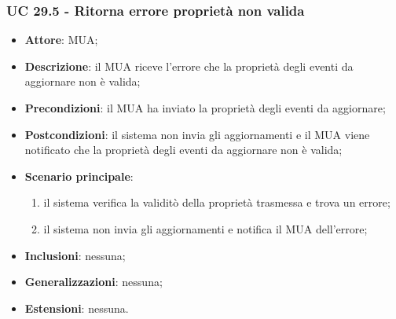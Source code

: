     \subsubsection{UC 29.5 - Ritorna errore proprietà non valida} \label{sec:UC29.5}
    \begin{itemize}
        \item \textbf{Attore}: MUA;
        \item \textbf{Descrizione}: il MUA riceve l'errore che la proprietà degli eventi da aggiornare non è valida;
        \item \textbf{Precondizioni}: il MUA ha inviato la proprietà degli eventi da aggiornare;
        \item \textbf{Postcondizioni}: il sistema non invia gli aggiornamenti e il MUA viene notificato che la proprietà degli eventi da aggiornare non è valida;
        \item \textbf{Scenario principale}:
            \begin{enumerate}
                \item il sistema verifica la validitò della proprietà trasmessa e trova un errore;
                \item il sistema non invia gli aggiornamenti e notifica il MUA dell'errore;
            \end{enumerate}
        \item \textbf{Inclusioni}: nessuna;
        \item \textbf{Generalizzazioni}: nessuna;
        \item \textbf{Estensioni}: nessuna.
    \end{itemize}
